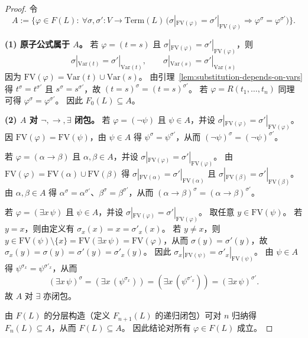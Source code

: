 \documentclass[lang=cn,a4paper,newtx,section]{elegantbook}
\begin{document}
 \begin{proof}
 令
 \[
   A:=\bigl\{\varphi\in F(L):\ \forall\sigma,\sigma':V\to\mathrm{Term}(L)\,\bigl(\sigma|_{\mathrm{FV}(\varphi)}=\sigma'|_{\mathrm{FV}(\varphi)}\Rightarrow\varphi^{\sigma}=\varphi^{\sigma'}\bigr)\bigr\}.
 \]

 \textbf{(1) 原子公式属于 $A$。}
 若 $\varphi=(t=s)$ 且 $\sigma|_{\mathrm{FV}(\varphi)}=\sigma'|_{\mathrm{FV}(\varphi)}$，则
 \[\sigma|_{\mathrm{Var}(t)}=\sigma'|_{\mathrm{Var}(t)},\qquad \sigma|_{\mathrm{Var}(s)}=\sigma'|_{\mathrm{Var}(s)}\]
 因为 $\mathrm{FV}(\varphi)=\mathrm{Var}(t)\cup\mathrm{Var}(s)$。
 由引理~\ref{lem:substitution-depends-on-vars} 得 $t^{\sigma}=t^{\sigma'}$ 且 $s^{\sigma}=s^{\sigma'}$，故 $(t=s)^{\sigma}=(t=s)^{\sigma'}$。
 若 $\varphi=R(t_1,\dots,t_n)$ 同理可得 $\varphi^{\sigma}=\varphi^{\sigma'}$。
 因此 $F_0(L)\subseteq A$。

 \textbf{(2) $A$ 对 $\neg,\to,\exists$ 闭包。}
 若 $\varphi=(\neg\psi)$ 且 $\psi\in A$，并设 $\sigma|_{\mathrm{FV}(\varphi)}=\sigma'|_{\mathrm{FV}(\varphi)}$。
 因 $\mathrm{FV}(\varphi)=\mathrm{FV}(\psi)$，由 $\psi\in A$ 得 $\psi^{\sigma}=\psi^{\sigma'}$，从而 $(\neg\psi)^{\sigma}=(\neg\psi)^{\sigma'}$。

 若 $\varphi=(\alpha\to\beta)$ 且 $\alpha,\beta\in A$，并设 $\sigma|_{\mathrm{FV}(\varphi)}=\sigma'|_{\mathrm{FV}(\varphi)}$。
 由 $\mathrm{FV}(\varphi)=\mathrm{FV}(\alpha)\cup\mathrm{FV}(\beta)$ 得
 $\sigma|_{\mathrm{FV}(\alpha)}=\sigma'|_{\mathrm{FV}(\alpha)}$ 且 $\sigma|_{\mathrm{FV}(\beta)}=\sigma'|_{\mathrm{FV}(\beta)}$。
 由 $\alpha,\beta\in A$ 得 $\alpha^{\sigma}=\alpha^{\sigma'}$、$\beta^{\sigma}=\beta^{\sigma'}$，从而 $(\alpha\to\beta)^{\sigma}=(\alpha\to\beta)^{\sigma'}$。

 若 $\varphi=(\exists x\,\psi)$ 且 $\psi\in A$，并设 $\sigma|_{\mathrm{FV}(\varphi)}=\sigma'|_{\mathrm{FV}(\varphi)}$。
 取任意 $y\in\mathrm{FV}(\psi)$。
 若 $y=x$，则由定义有 $\sigma_x(x)=x=\sigma'_x(x)$。
 若 $y\neq x$，则 $y\in\mathrm{FV}(\psi)\setminus\{x\}=\mathrm{FV}(\exists x\,\psi)=\mathrm{FV}(\varphi)$，从而 $\sigma(y)=\sigma'(y)$，故 $\sigma_x(y)=\sigma(y)=\sigma'(y)=\sigma'_x(y)$。
 因此 $\sigma_x|_{\mathrm{FV}(\psi)}=\sigma'_x|_{\mathrm{FV}(\psi)}$。
 由 $\psi\in A$ 得 $\psi^{\sigma_x}=\psi^{\sigma'_x}$，从而
 \[
   (\exists x\,\psi)^{\sigma}=(\exists x\,(\psi^{\sigma_x}))=(\exists x\,(\psi^{\sigma'_x}))=(\exists x\,\psi)^{\sigma'}.
 \]
 故 $A$ 对 $\exists$ 亦闭包。

 由 $F(L)$ 的分层构造（定义 $F_{n+1}(L)$ 的递归闭包）可对 $n$ 归纳得 $F_n(L)\subseteq A$，从而 $F(L)\subseteq A$。
 因此结论对所有 $\varphi\in F(L)$ 成立。
 \end{proof}
\end{document}
